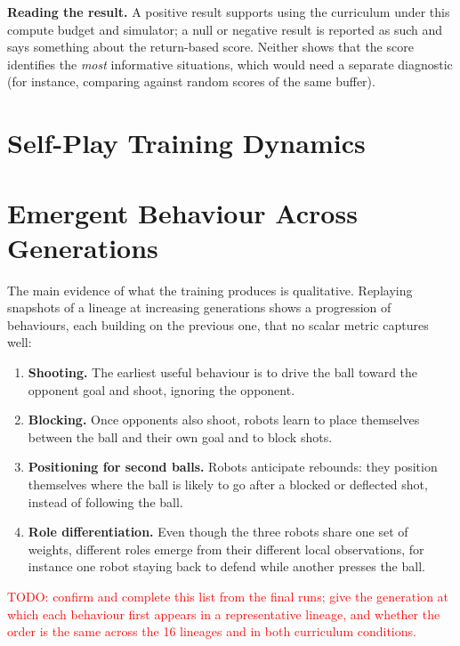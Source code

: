 \textbf{Reading the result.}  A positive result supports using the curriculum under this compute budget and simulator; a null or negative result is reported as such and says something about the return-based score.  Neither
shows that the score identifies the \emph{most} informative situations, which would need a separate diagnostic (for instance, comparing against random scores of the same buffer).

\section{Self-Play Training Dynamics}
\label{sec:selfplay_dynamics}


\section{Emergent Behaviour Across Generations}
\label{sec:behaviour}

The main evidence of what the training produces is qualitative.  Replaying snapshots of a lineage at increasing generations shows a progression of behaviours, each building on the previous one, that no scalar metric captures well:
\begin{enumerate}
  \item \textbf{Shooting.}  The earliest useful behaviour is to drive the ball toward the opponent goal and shoot, ignoring the opponent.
  \item \textbf{Blocking.}  Once opponents also shoot, robots learn to place themselves between the ball and their own goal and to block shots.
  \item \textbf{Positioning for second balls.}  Robots anticipate rebounds: they position themselves where the ball is likely to go after a blocked or deflected shot, instead of following the ball.
  \item \textbf{Role differentiation.}  Even though the three robots share one set of weights, different roles emerge from their different local observations, for instance one robot staying back to defend while another presses the ball.
\end{enumerate}
\textcolor{red}{TODO: confirm and complete this list from the final runs; give the generation at which each behaviour first appears in a representative lineage, and whether the order is the same across the 16 lineages and in both curriculum conditions.}

